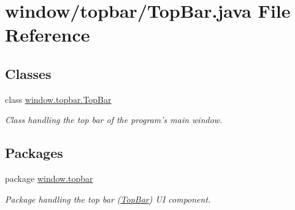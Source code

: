 \hypertarget{a00054}{\section{window/topbar/\-Top\-Bar.java File Reference}
\label{a00054}
}
\subsection*{Classes}
\begin{DoxyCompactItemize}
\item 
class \hyperlink{a00031}{window.\-topbar.\-Top\-Bar}
\begin{DoxyCompactList}\small\item\em Class handling the top bar of the program's main window. \end{DoxyCompactList}\end{DoxyCompactItemize}
\subsection*{Packages}
\begin{DoxyCompactItemize}
\item 
package \hyperlink{a00087}{window.\-topbar}
\begin{DoxyCompactList}\small\item\em Package handling the top bar (\hyperlink{a00031}{Top\-Bar}) U\-I component. \end{DoxyCompactList}\end{DoxyCompactItemize}
